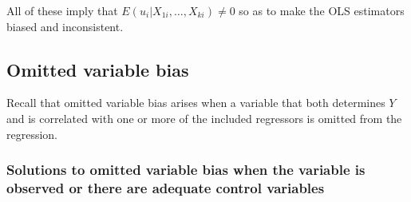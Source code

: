 \documentclass[a4paper,11pt]{article}
\begin{document}
All of these imply that \(E(u_i|X_{1i},…,X_{ki}) \neq 0\) so as to make
the OLS estimators biased and inconsistent.  

\subsection{Omitted variable bias}
\label{sec:org22aaf20}
Recall that omitted variable bias arises when a variable that both
determines \(Y\) and is correlated with one or more of the included
regressors is omitted from the regression. 

\subsubsection*{Solutions to omitted variable bias when the variable is observed or there are adequate control variables}
\label{sec:org234ee51}
\end{document}
